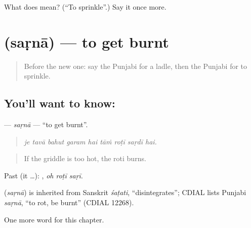 \begin{tcolorbox}[breakable,colback=teal!4,colframe=teal!35!black,title={Before you move on}]
What does  mean? (\textquotedblleft{}To sprinkle\textquotedblright{}.) Say it once more.
\end{tcolorbox}
\section[\texorpdfstring{\pa{ਸੜਨਾ} (saṛnā)}{ਸੜਨਾ (saṛnā)}]{ (saṛnā) — to get burnt}

\label{lesson:PA-C242-sarna}



\begin{quote}
Before the new one: say the Punjabi for a ladle, then the Punjabi for to sprinkle.
\end{quote}

\subsection*{You'll want to know: }
\textbf{} — \emph{saṛnā} — \textquotedblleft{}to get burnt\textquotedblright{}.

\begin{quote}
        
\end{quote}

\begin{quote}
\emph{je tavā bahut garam hai tāṁ roṭī saṛdī hai.}
\end{quote}

\begin{quote}
If the griddle is too hot, the roti burns.
\end{quote}

Past (it …):   , \emph{oh roṭī saṛī}.

\begin{cousinweb}
\textbf{} (\emph{saṛnā}) is inherited from Sanskrit \emph{śaṭati}, \textquotedblleft{}disintegrates\textquotedblright{}; CDIAL lists Punjabi \emph{saṛnā}, \textquotedblleft{}to rot, be burnt\textquotedblright{} (CDIAL 12268).
\end{cousinweb}

\begin{grammarlens}[title={What you've built}]
One more word for this chapter.
\end{grammarlens}

